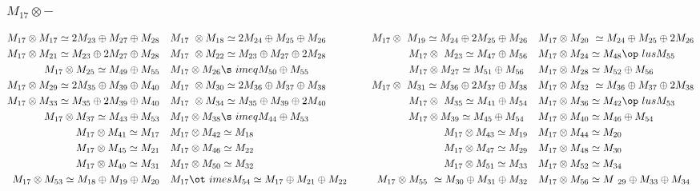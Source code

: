 \subsubsection{$M_17\otimes -$}
\begin{align*}
M_{17} \otimes M_{17} \simeq 2 M_{23} \oplus M_{27} \oplus M_{28} &&& M_{17} \
\otimes M_{18} \simeq 2 M_{24} \oplus M_{25} \oplus M_{26} &&& M_{17} \otimes \
M_{19} \simeq M_{24} \oplus 2 M_{25} \oplus M_{26} &&& M_{17} \otimes M_{20} \
\simeq M_{24} \oplus M_{25} \oplus 2 M_{26}\\
M_{17} \otimes M_{21} \simeq M_{23} \oplus 2 M_{27} \oplus M_{28} &&& M_{17} \
\otimes M_{22} \simeq M_{23} \oplus M_{27} \oplus 2 M_{28} &&& M_{17} \otimes \
M_{23} \simeq M_{47} \oplus M_{56} &&& M_{17} \otimes M_{24} \simeq M_{48} \op\
lus M_{55}\\
M_{17} \otimes M_{25} \simeq M_{49} \oplus M_{55} &&& M_{17} \otimes M_{26} \s\
imeq M_{50} \oplus M_{55} &&& M_{17} \otimes M_{27} \simeq M_{51} \oplus M_{56\
} &&& M_{17} \otimes M_{28} \simeq M_{52} \oplus M_{56}\\
M_{17} \otimes M_{29} \simeq 2 M_{35} \oplus M_{39} \oplus M_{40} &&& M_{17} \
\otimes M_{30} \simeq 2 M_{36} \oplus M_{37} \oplus M_{38} &&& M_{17} \otimes \
M_{31} \simeq M_{36} \oplus 2 M_{37} \oplus M_{38} &&& M_{17} \otimes M_{32} \
\simeq M_{36} \oplus M_{37} \oplus 2 M_{38}\\
M_{17} \otimes M_{33} \simeq M_{35} \oplus 2 M_{39} \oplus M_{40} &&& M_{17} \
\otimes M_{34} \simeq M_{35} \oplus M_{39} \oplus 2 M_{40} &&& M_{17} \otimes \
M_{35} \simeq M_{41} \oplus M_{54} &&& M_{17} \otimes M_{36} \simeq M_{42} \op\
lus M_{53}\\
M_{17} \otimes M_{37} \simeq M_{43} \oplus M_{53} &&& M_{17} \otimes M_{38} \s\
imeq M_{44} \oplus M_{53} &&& M_{17} \otimes M_{39} \simeq M_{45} \oplus M_{54\
} &&& M_{17} \otimes M_{40} \simeq M_{46} \oplus M_{54}\\
M_{17} \otimes M_{41} \simeq M_{17} &&& M_{17} \otimes M_{42} \simeq M_{18} &&\
& M_{17} \otimes M_{43} \simeq M_{19} &&& M_{17} \otimes M_{44} \simeq M_{20}\
\\
M_{17} \otimes M_{45} \simeq M_{21} &&& M_{17} \otimes M_{46} \simeq M_{22} &&\
& M_{17} \otimes M_{47} \simeq M_{29} &&& M_{17} \otimes M_{48} \simeq M_{30}\
\\
M_{17} \otimes M_{49} \simeq M_{31} &&& M_{17} \otimes M_{50} \simeq M_{32} &&\
& M_{17} \otimes M_{51} \simeq M_{33} &&& M_{17} \otimes M_{52} \simeq M_{34}\
\\
M_{17} \otimes M_{53} \simeq M_{18} \oplus M_{19} \oplus M_{20} &&& M_{17} \ot\
imes M_{54} \simeq M_{17} \oplus M_{21} \oplus M_{22} &&& M_{17} \otimes M_{55\
} \simeq M_{30} \oplus M_{31} \oplus M_{32} &&& M_{17} \otimes M_{56} \simeq M\
_{29} \oplus M_{33} \oplus M_{34}\\
\end{align*}

